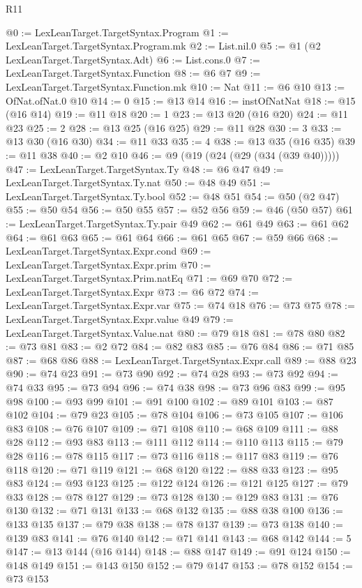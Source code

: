 \begin{lexlean}{R11}
\begin{coremodule}
@0 := LexLeanTarget.TargetSyntax.Program
@1 := LexLeanTarget.TargetSyntax.Program.mk
@2 := List.nil.{0}
@5 := @1 (@2 LexLeanTarget.TargetSyntax.Adt)
@6 := List.cons.{0}
@7 := LexLeanTarget.TargetSyntax.Function
@8 := @6 @7
@9 := LexLeanTarget.TargetSyntax.Function.mk
@10 := Nat
@11 := @6 @10
@13 := OfNat.ofNat.{0} @10
@14 := 0
@15 := @13 @14
@16 := instOfNatNat
@18 := @15 (@16 @14)
@19 := @11 @18
@20 := 1
@23 := @13 @20 (@16 @20)
@24 := @11 @23
@25 := 2
@28 := @13 @25 (@16 @25)
@29 := @11 @28
@30 := 3
@33 := @13 @30 (@16 @30)
@34 := @11 @33
@35 := 4
@38 := @13 @35 (@16 @35)
@39 := @11 @38
@40 := @2 @10
@46 := @9 (@19 (@24 (@29 (@34 (@39 @40)))))
@47 := LexLeanTarget.TargetSyntax.Ty
@48 := @6 @47
@49 := LexLeanTarget.TargetSyntax.Ty.nat
@50 := @48 @49
@51 := LexLeanTarget.TargetSyntax.Ty.bool
@52 := @48 @51
@54 := @50 (@2 @47)
@55 := @50 @54
@56 := @50 @55
@57 := @52 @56
@59 := @46 (@50 @57)
@61 := LexLeanTarget.TargetSyntax.Ty.pair @49
@62 := @61 @49
@63 := @61 @62
@64 := @61 @63
@65 := @61 @64
@66 := @61 @65
@67 := @59 @66
@68 := LexLeanTarget.TargetSyntax.Expr.cond
@69 := LexLeanTarget.TargetSyntax.Expr.prim
@70 := LexLeanTarget.TargetSyntax.Prim.natEq
@71 := @69 @70
@72 := LexLeanTarget.TargetSyntax.Expr
@73 := @6 @72
@74 := LexLeanTarget.TargetSyntax.Expr.var
@75 := @74 @18
@76 := @73 @75
@78 := LexLeanTarget.TargetSyntax.Expr.value @49
@79 := LexLeanTarget.TargetSyntax.Value.nat
@80 := @79 @18
@81 := @78 @80
@82 := @73 @81
@83 := @2 @72
@84 := @82 @83
@85 := @76 @84
@86 := @71 @85
@87 := @68 @86
@88 := LexLeanTarget.TargetSyntax.Expr.call
@89 := @88 @23
@90 := @74 @23
@91 := @73 @90
@92 := @74 @28
@93 := @73 @92
@94 := @74 @33
@95 := @73 @94
@96 := @74 @38
@98 := @73 @96 @83
@99 := @95 @98
@100 := @93 @99
@101 := @91 @100
@102 := @89 @101
@103 := @87 @102
@104 := @79 @23
@105 := @78 @104
@106 := @73 @105
@107 := @106 @83
@108 := @76 @107
@109 := @71 @108
@110 := @68 @109
@111 := @88 @28
@112 := @93 @83
@113 := @111 @112
@114 := @110 @113
@115 := @79 @28
@116 := @78 @115
@117 := @73 @116
@118 := @117 @83
@119 := @76 @118
@120 := @71 @119
@121 := @68 @120
@122 := @88 @33
@123 := @95 @83
@124 := @93 @123
@125 := @122 @124
@126 := @121 @125
@127 := @79 @33
@128 := @78 @127
@129 := @73 @128
@130 := @129 @83
@131 := @76 @130
@132 := @71 @131
@133 := @68 @132
@135 := @88 @38 @100
@136 := @133 @135
@137 := @79 @38
@138 := @78 @137
@139 := @73 @138
@140 := @139 @83
@141 := @76 @140
@142 := @71 @141
@143 := @68 @142
@144 := 5
@147 := @13 @144 (@16 @144)
@148 := @88 @147
@149 := @91 @124
@150 := @148 @149
@151 := @143 @150
@152 := @79 @147
@153 := @78 @152
@154 := @73 @153

\end{coremodule}
\end{lexlean}

